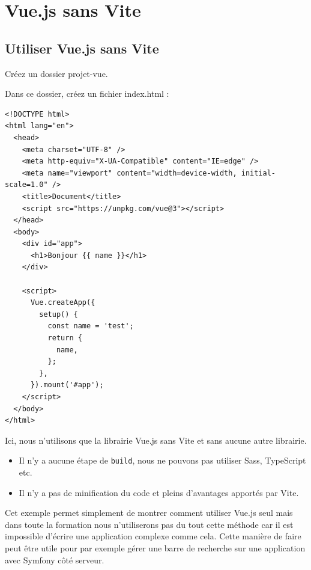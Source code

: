 

\section{Vue.js sans Vite}
\subsection{Utiliser {\color{monOrange}Vue.js} sans {\color{monOrange}Vite}}
Créez un dossier projet-vue.

Dans ce dossier, créez un fichier index.html :
\begin{verbatim}
<!DOCTYPE html>
<html lang="en">
  <head>
    <meta charset="UTF-8" />
    <meta http-equiv="X-UA-Compatible" content="IE=edge" />
    <meta name="viewport" content="width=device-width, initial-scale=1.0" />
    <title>Document</title>
    <script src="https://unpkg.com/vue@3"></script>
  </head>
  <body>
    <div id="app">
      <h1>Bonjour {{ name }}</h1>
    </div>

    <script>
      Vue.createApp({
        setup() {
          const name = 'test';
          return {
            name,
          };
        },
      }).mount('#app');
    </script>
  </body>
</html>
\end{verbatim} 

Ici, nous n'utilisons que la librairie {\color{monOrange}Vue.js} sans {\color{monOrange}Vite} et sans aucune autre librairie. 
\begin{itemize}
\item Il n'y a aucune étape de {\tt build}, nous ne pouvons pas utiliser Sass, TypeScript etc.

\item Il n'y a pas de minification du code et pleins d'avantages apportés par {\color{monOrange}Vite}.
\end{itemize}
Cet exemple permet simplement de montrer comment utiliser {\color{monOrange}Vue.js} seul mais dans toute la formation nous n'utiliserons pas du tout cette méthode car il est impossible d'écrire une application complexe comme cela. Cette manière de faire peut être utile pour par exemple gérer une barre de recherche sur une application avec {\color{monOrange}Symfony} côté serveur.
